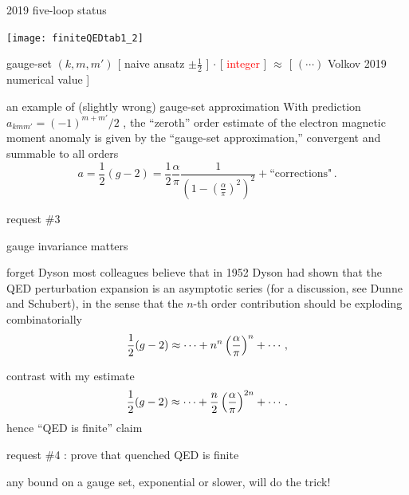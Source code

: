 \begin{frame}{2019 five-loop status}
\begin{center}
\texttt{[image: finiteQEDtab1\_2]}
\end{center}


\begin{block} {gauge-set $(k,m,m')$}
{\scriptsize
[ naive ansatz $\pm\frac{1}{2}$ ] $\cdot$
[ \textcolor{red}{integer} ] $\approx$ %
[ $(\cdots)$ Volkov 2019 numerical value ]
            } %
\end{block}
\end{frame}


\begin{frame}{an example of (slightly wrong) gauge-set approximation}
With prediction \(
a_{kmm'} = (-1)^{m+m'}\!/2
\) %
, the ``zeroth'' order estimate of the electron
magnetic moment anomaly is given by the ``gauge-set
approximation,'' convergent and summable to all orders
\[ %
a=\frac{1}{2}(g-2) =  \frac{1}{2} \frac{\alpha}{\pi}
                     \frac{1}
           {\left( 1 - \left(\frac{\alpha}{\pi}\right)^2
			\right)^2
		      } + \mbox{``corrections"}
\,.
\] %
\end{frame}

\begin{frame}{request \#3}
\begin{center}
{\huge gauge invariance matters}
\end{center}
\end{frame}


\begin{frame}{forget Dyson}
most
colleagues believe that in 1952 Dyson had  shown that the
QED perturbation expansion is an asymptotic series (for a discussion, see
Dunne and Schubert), in the sense that the $n$-th order
contribution should be exploding combinatorially
$$
{1 \over 2} (g-2) \approx
\cdots + n^n \left(\frac{\alpha}{\pi}\right)^n + \cdots
\,,
$$

contrast with my estimate
\[
{1 \over 2} (g-2) \approx
\cdots + \frac{n}{2}\left(\frac{\alpha}{\pi}\right)^{2n} + \cdots
\,.
\]
hence ``QED is finite'' claim
\end{frame}

\begin{frame}{request \#4 : prove that quenched QED is finite}
\begin{center}
{\huge any bound on a gauge set, exponential or slower, will do the trick!}
\end{center}
\end{frame}

